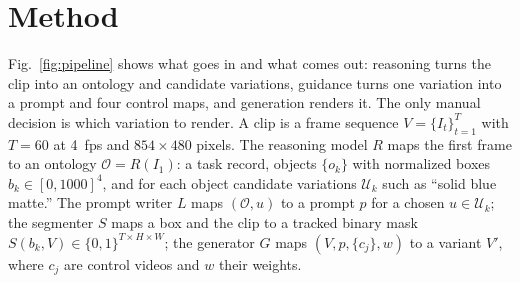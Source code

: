 \section{Method}
\label{sec:method}

Fig.~\ref{fig:pipeline} shows what goes in and what comes out: reasoning turns the clip into an ontology and candidate variations, guidance turns one variation into a prompt and four control maps, and generation renders it. The only manual decision is which variation to render. A clip is a frame sequence $V=\{I_t\}_{t=1}^{T}$ with $T=60$ at 4~fps and $854\times480$ pixels. The reasoning model $R$ maps the first frame to an ontology $\mathcal{O}=R(I_1)$: a task record, objects $\{o_k\}$ with normalized boxes $b_k\in[0,1000]^4$, and for each object candidate variations $\mathcal{U}_k$ such as ``solid blue matte.'' The prompt writer $L$ maps $(\mathcal{O},u)$ to a prompt $p$ for a chosen $u\in\mathcal{U}_k$; the segmenter $S$ maps a box and the clip to a tracked binary mask $S(b_k,V)\in\{0,1\}^{T\times H\times W}$; the generator $G$ maps $(V,p,\{c_j\},w)$ to a variant $V'$, where $c_j$ are control videos and $w$ their weights.

